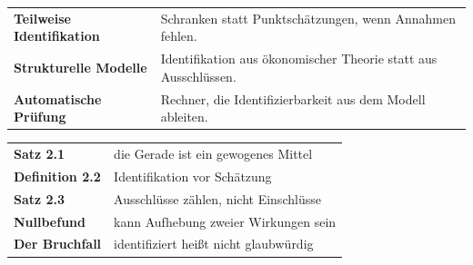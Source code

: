 \begin{forschung}
\begin{center}
{\small
\renewcommand{\arraystretch}{1.45}
\begin{tabular}{@{}P{3.2cm}P{5.0cm}@{}}
\toprule
\textbf{Teilweise Identifikation} & Schranken statt Punktschätzungen, wenn Annahmen fehlen.\\
\textbf{Strukturelle Modelle} & Identifikation aus ökonomischer Theorie statt aus Ausschlüssen.\\
\textbf{Automatische Prüfung} & Rechner, die Identifizierbarkeit aus dem Modell ableiten.\\
\bottomrule
\end{tabular}}
\end{center}

\begin{center}
\begin{minipage}{0.88\textwidth}
\end{minipage}
\end{center}
\end{forschung}

\begin{merksatz}
\begin{center}
\renewcommand{\arraystretch}{1.5}
\begin{tabular}{@{}P{3.0cm}P{5.6cm}@{}}
\toprule
\textbf{Satz 2.1} & die Gerade ist ein gewogenes Mittel\\
\textbf{Definition 2.2} & Identifikation vor Schätzung\\
\textbf{Satz 2.3} & Ausschlüsse zählen, nicht Einschlüsse\\
\textbf{Nullbefund} & kann Aufhebung zweier Wirkungen sein\\
\textbf{Der Bruchfall} & identifiziert heißt nicht glaubwürdig\\
\bottomrule
\end{tabular}
\end{center}

\begin{center}
\begin{minipage}{0.88\textwidth}
\end{minipage}
\end{center}
\end{merksatz}
